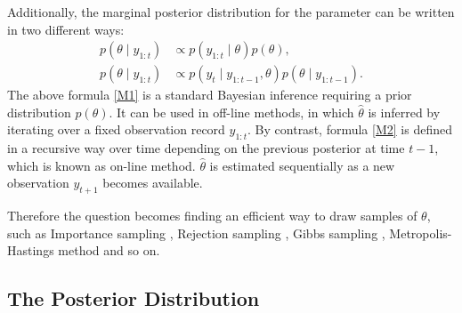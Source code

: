 Additionally, the marginal posterior distribution for the parameter can be written in two different ways: 
\begin{align}\label{M1}
p(\theta \mid y_{1:t}) &\propto p(y_{1:t}\mid\theta)p(\theta),\\
p(\theta \mid y_{1:t}) &\propto p(y_t\mid y_{1:t-1}, \theta)p(\theta\mid y_{1:t-1}). \label{M2}
\end{align}
The above formula \eqref{M1} is a standard Bayesian inference requiring a prior distribution $p(\theta)$. It can be used in off-line methods, in which $\hat{\theta}$ is inferred by iterating over a fixed observation record $y_{1:t}$. By contrast, formula \eqref{M2} is defined in a recursive way over time depending on the previous posterior at time $t-1$, which is known as on-line method. $\hat{\theta}$ is estimated sequentially as a new observation $y_{t+1}$ becomes available. 


Therefore the question becomes finding an efficient way to draw samples of $\theta$, such as Importance sampling \citep{hammersley1964percolation, geweke1989bayesian}, Rejection sampling \citep{casella2004generalized, martino2010generalized}, Gibbs sampling \citep{geman1984stochastic}, Metropolis-Hastings method \citep{metropolis1953equation, hastings1970monte} and so on. 

\subsection{The Posterior Distribution}\label{sectionlogParameter}

